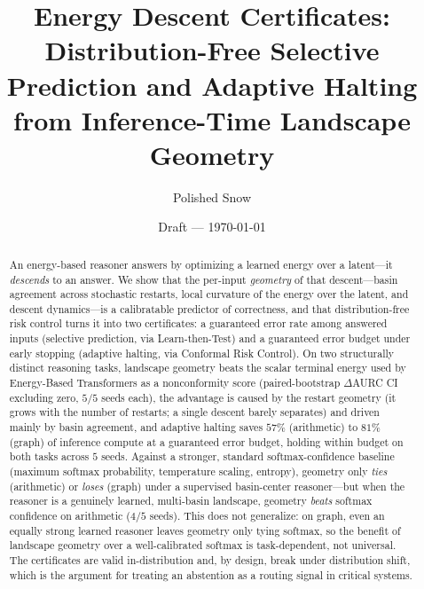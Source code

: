 \documentclass[11pt]{article}
\title{Energy Descent Certificates: Distribution-Free Selective Prediction and
Adaptive Halting from Inference-Time Landscape Geometry}
\author{Polished Snow}
\date{Draft --- \today}
\begin{document}
\maketitle

\begin{abstract}
An energy-based reasoner answers by optimizing a learned energy over a latent---it
\emph{descends} to an answer. We show that the per-input \emph{geometry} of that descent---basin
agreement across stochastic restarts, local curvature of the energy over the latent, and descent
dynamics---is a calibratable predictor of correctness, and that distribution-free risk control turns
it into two certificates: a guaranteed error rate among answered inputs (selective prediction, via
Learn-then-Test) and a guaranteed error budget under early stopping (adaptive halting, via Conformal
Risk Control). On two structurally distinct reasoning tasks, landscape geometry beats the scalar
terminal energy used by Energy-Based Transformers as a nonconformity score (paired-bootstrap
$\Delta$AURC CI excluding zero, $5/5$ seeds each), the advantage is caused by the restart geometry
(it grows with the number of restarts; a single descent barely separates) and driven mainly by basin
agreement, and adaptive halting saves $57\%$ (arithmetic) to $81\%$ (graph) of inference compute at a
guaranteed error budget, holding within budget on both tasks across $5$ seeds. Against a stronger, standard softmax-confidence baseline (maximum softmax probability, temperature
scaling, entropy), geometry only \emph{ties} (arithmetic) or \emph{loses} (graph) under a supervised
basin-center reasoner---but when the reasoner is a genuinely learned, multi-basin landscape,
geometry \emph{beats} softmax confidence on arithmetic ($4/5$ seeds). This does not generalize: on
graph, even an equally strong learned reasoner leaves geometry only tying softmax, so the benefit of
landscape geometry over a well-calibrated softmax is task-dependent, not universal. The certificates are valid in-distribution and, by design, break
under distribution shift, which is the argument for treating an abstention as a routing signal in
critical systems.
\end{abstract}











\end{document}
